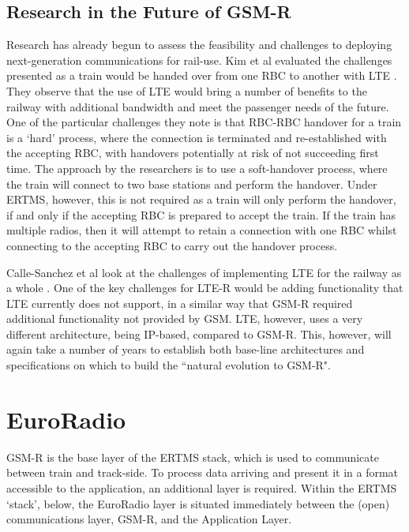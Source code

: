 \documentclass[twoside,11pt,a4paper]{article}
\begin{document}
\subsection{Research in the Future of GSM-R}
Research has already begun to assess the feasibility and challenges to deploying next-generation communications for rail-use. Kim et al evaluated the challenges presented as a train would be handed over from one RBC to another with LTE \citep{Kim14a}. They observe that the use of LTE would bring a number of benefits to the railway with additional bandwidth and meet the passenger needs of the future. One of the particular challenges they note is that RBC-RBC handover for a train is a `hard' process, where the connection is terminated and re-established with the accepting RBC, with handovers potentially at risk of not succeeding first time. The approach by the researchers is to use a soft-handover process, where the train will connect to two base stations and perform the handover. Under ERTMS, however, this is not required as a train will only perform the handover, if and only if the accepting RBC is prepared to accept the train. If the train has multiple radios, then it will attempt to retain a connection with one RBC whilst connecting to the accepting RBC to carry out the handover process.

Calle-Sanchez et al look at the challenges of implementing LTE for the railway as a whole \citep{CalleSanchez12a}. One of the key challenges for LTE-R would be adding functionality that LTE currently does not support, in a similar way that GSM-R required additional functionality not provided by GSM. LTE, however, uses a very different architecture, being IP-based, compared to GSM-R. This, however, will again take a number of years to establish both base-line architectures and specifications on which to build the ``natural evolution to GSM-R".

\clearpage

\section{EuroRadio}
GSM-R is the base layer of the ERTMS stack, which is used to communicate between train and track-side. To process data arriving and present it in a format accessible to the application, an additional layer is required. Within the ERTMS `stack', below, the EuroRadio layer is situated immediately between the (open) communications layer, GSM-R, and the Application Layer. 
\end{document}
